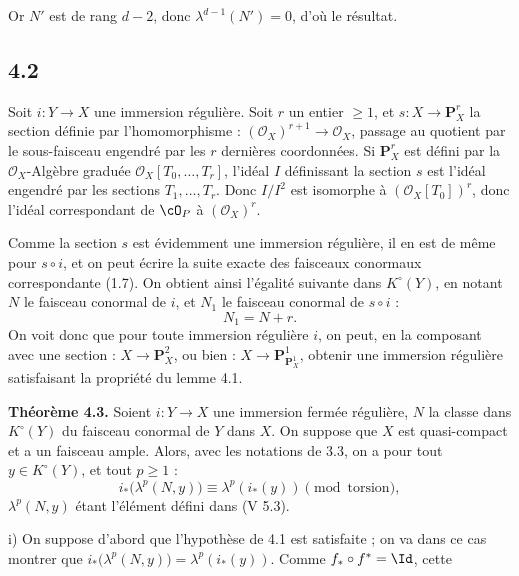 Or \(N'\) est de
rang \(d-2\), donc \(\lambda^{d-1}(N')=0\), d'où le résultat.

\subsection*{4.2}

Soit \(i:Y\to X\) une immersion régulière. Soit \(r\) un entier \(\ge1\), et \(s:X\longrightarrow \mathbf P_X^r\) la section définie par l'homomorphisme : \((\mathcal O_X)^{r+1}\to\mathcal O_X\), passage au quotient par le sous-faisceau engendré par les \(r\) dernières coordonnées. Si \(\mathbf P_X^r\) est défini par la \(\mathcal O_X\)-Algèbre graduée \(\mathcal O_X[T_0,\ldots,T_r]\), l'idéal \(I\) définissant la section \(s\) est l'idéal engendré par les sections \(T_1,\ldots,T_r\). Donc \(I/I^2\) est isomorphe à \((\mathcal O_X[T_0])^r\), donc l'idéal correspondant de \(\cO_P\) à \((\mathcal O_X)^r\).

Comme la section \(s\) est évidemment une immersion régulière, il en est de même pour \(s\circ i\), et on peut écrire la suite exacte des faisceaux conormaux correspondante (1.7). On obtient ainsi l'égalité suivante dans \(K^\circ(Y)\), en notant \(N\) le faisceau conormal de \(i\), et \(N_1\) le faisceau conormal de \(s\circ i\) :
\[
  N_1=N+r.
\]
On voit donc que pour toute immersion régulière \(i\), on peut, en la composant avec une section : \(X\to\mathbf P_X^2\), ou bien : \(X\to\mathbf P_{\mathbf P_X^1}^{1}\), obtenir une immersion régulière satisfaisant la propriété du lemme 4.1.

\textbf{Théorème 4.3.} Soient \(i:Y\to X\) une immersion fermée régulière, \(N\) la classe dans \(K^\circ(Y)\) du faisceau conormal de \(Y\) dans \(X\). On suppose que \(X\) est quasi-compact et a un faisceau ample. Alors, avec les notations de 3.3, on a pour tout \(y\in K^\circ(Y)\), et tout \(p\ge1\) :
\begin{equation}\tag{4.3.1}
 i_*\bigl(\lambda^p(N,y)\bigr)\equiv \lambda^p(i_*(y))
 \pmod{\text{torsion}},
\end{equation}
\(\lambda^p(N,y)\) étant l'élément défini dans (V 5.3).

i) On suppose d'abord que l'hypothèse de 4.1 est satisfaite ; on va dans ce cas montrer que \(i_*\bigl(\lambda^p(N,y)\bigr)=\lambda^p(i_*(y))\). Comme \(f_*\circ f^*=\Id\), cette
